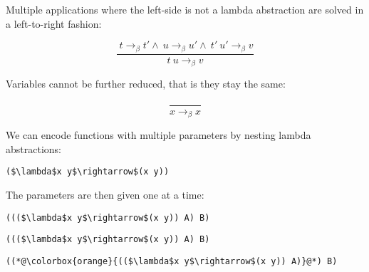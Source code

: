 \documentclass{beamer}
\begin{document}
\begin{frame}[fragile]{\CurrentSection}
\begin{exampleblock}{}
Multiple applications where the left-side is not a lambda abstraction are solved in a left-to-right fashion:
\end{exampleblock}

 
\pause 
$$\frac{\ t \rightarrow_\beta t'\wedge\ u \rightarrow_\beta u'\wedge\ t'\ u' \rightarrow_\beta v}{t\ u \rightarrow_\beta v}$$
 

\end{frame}

\begin{frame}[fragile]{\CurrentSection}
\begin{exampleblock}{}
Variables cannot be further reduced, that is they stay the same:
\end{exampleblock}

 
\pause 
$$\frac{}{x \rightarrow_\beta x}$$
 

\end{frame}

\begin{frame}[fragile]{\CurrentSection}
\begin{exampleblock}{}
We can encode functions with multiple parameters by nesting lambda abstractions:
\end{exampleblock}

 
\lstset{basicstyle=\ttfamily\small}\lstset{numbers=none}\lstset{language=ML}\begin{lstlisting}
($\lambda$x y$\rightarrow$(x y))
\end{lstlisting}
 

\end{frame}

\begin{frame}[fragile]{\CurrentSection}
\begin{exampleblock}{}
The parameters are then given one at a time:
\end{exampleblock}

 
\lstset{basicstyle=\ttfamily\small}\lstset{numbers=none}\lstset{language=ML}\begin{lstlisting}
((($\lambda$x y$\rightarrow$(x y)) A) B)
\end{lstlisting}
 

\end{frame}

\begin{frame}[fragile]{\CurrentSection}
\lstset{basicstyle=\ttfamily\small}\lstset{numbers=none}\lstset{language=ML}\begin{lstlisting}
((($\lambda$x y$\rightarrow$(x y)) A) B)
\end{lstlisting}
\pause\lstset{language=ML}\begin{lstlisting}
((*@\colorbox{orange}{(($\lambda$x y$\rightarrow$(x y)) A)}@*) B)
\end{lstlisting}

\end{frame}
\end{document}
